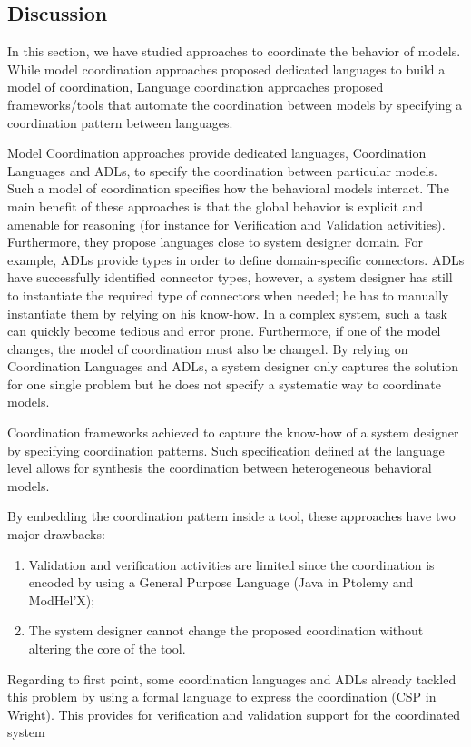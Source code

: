 \subsection{Discussion}
In this section, we have studied approaches to coordinate the behavior of models. While model coordination approaches proposed dedicated languages to build a model of coordination, Language coordination approaches proposed frameworks/tools that automate the coordination between models by specifying a coordination pattern between languages. 

Model Coordination approaches provide dedicated languages, \ie Coordination Languages and ADLs, to specify the coordination between particular models. Such a model of coordination specifies how the behavioral models interact. The main benefit of these approaches is that the global behavior is explicit and amenable for reasoning (for instance for Verification and Validation activities). Furthermore, they propose languages close to system designer domain. For example, ADLs provide types in order to define domain-specific connectors. ADLs have successfully identified connector types, however, a system designer has still to instantiate the required type of connectors when needed; he has to manually instantiate them by relying on his know-how. In a complex system, such a task can quickly become tedious and error prone. Furthermore, if one of the model changes, the model of coordination must also be changed. By relying on Coordination Languages and ADLs, a system designer only captures the solution for one single problem but he does not specify a systematic way to coordinate models. 

Coordination frameworks achieved to capture the know-how of a system designer by specifying coordination patterns. Such specification defined at the language level allows for synthesis the coordination between heterogeneous behavioral models. %

By embedding the coordination pattern inside a tool, these approaches have two major drawbacks:
\begin{enumerate}
	\item Validation and verification activities are limited since the coordination is encoded by using a General Purpose Language (\eg Java in Ptolemy and ModHel'X);
	\item The system designer cannot change the proposed coordination without altering the core of the tool.  
\end{enumerate}
Regarding to first point, some coordination languages and ADLs already tackled this problem by using a formal language to express the coordination (\eg CSP in Wright). This provides for verification and validation support for the coordinated system

